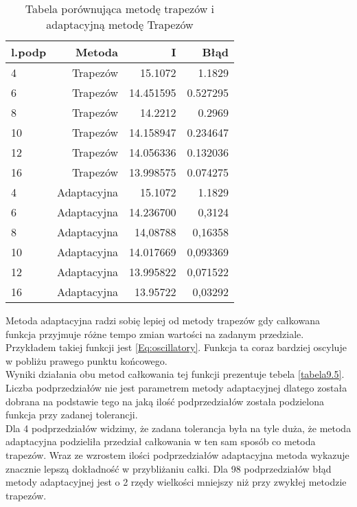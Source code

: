 \documentclass[12pt,twoside]{article}
\begin{document}
\begin{table}
\centering 
\caption{Tabela porównująca metodę trapezów i adaptacyjną metodę Trapezów}
\label{tabela9.4}
\begin{tabular}{lrrr}
\toprule
{l.podp} & Metoda &  I &  Błąd \\
\midrule
4  &     Trapezów & 15.1072  &   1.1829 \\
6  &     Trapezów & 14.451595 &   0.527295 \\
8  &     Trapezów & 14.2212   &   0.2969  \\
10  &    Trapezów & 14.158947  &   0.234647  \\
12  &    Trapezów & 14.056336 &    0.132036  \\
16 &     Trapezów & 13.998575  &   0.074275  \\

4  &     Adaptacyjna & 15.1072 &   1.1829 \\
6  &     Adaptacyjna & 14.236700 &   0,3124 \\
8  &     Adaptacyjna & 14,08788  &   0,16358  \\
10  &     Adaptacyjna & 14.017669 &  0,093369  \\
12  &    Adaptacyjna & 13.995822 &   0,071522  \\
16 &     Adaptacyjna & 13.95722 &    0,03292  \\

\bottomrule
\end{tabular}
\end{table}

Metoda adaptacyjna radzi sobię lepiej od metody trapezów gdy całkowana funkcja przyjmuje różne tempo zmian wartości na zadanym przedziale. Przykładem takiej funkcji jest \eqref{Eq:oscillatory}. Funkcja ta coraz bardziej oscyluje w pobliżu prawego punktu końcowego.\\
Wyniki działania obu metod całkowania tej funkcji prezentuje tebela \eqref{tabela9.5}.\\
Liczba podprzedziałów nie jest parametrem metody adaptacyjnej dlatego została dobrana na podstawie tego na jaką ilość podprzedziałów została podzielona funkcja przy zadanej tolerancji.\\
Dla 4 podprzedziałów widzimy, że zadana tolerancja była na tyle duża, że metoda adaptacyjna podzieliła przedział całkowania w ten sam sposób co metoda trapezów.
Wraz ze wzrostem ilości podprzedziałów adaptacyjna metoda wykazuje znacznie lepszą dokładność w przybliżaniu całki. Dla 98 podprzedziałów błąd metody adaptacyjnej jest o 2 rzędy wielkości mniejszy niż przy zwykłej metodzie trapezów.
\end{document}
